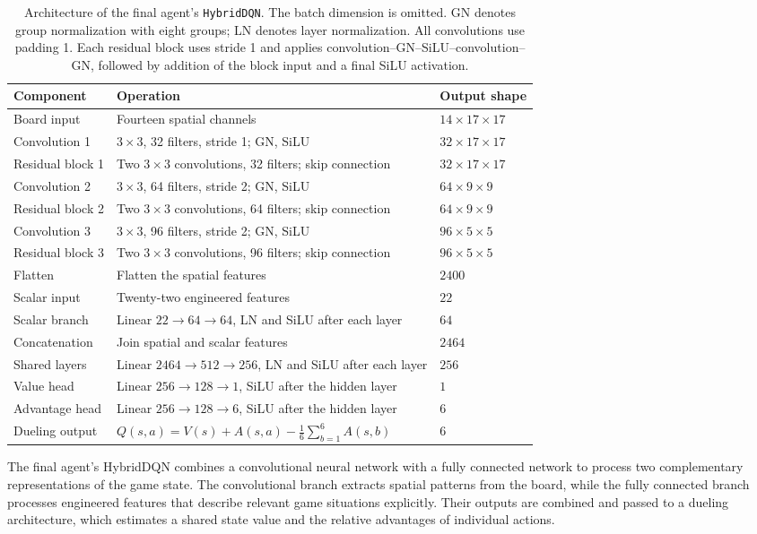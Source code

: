 \documentclass[11pt,a4paper]{article}
\begin{document}
\begin{table}[htbp]
\centering
\small
\begin{tabularx}{\textwidth}{@{}lYl@{}}
\toprule
Component & Operation & Output shape \\
\midrule
Board input & Fourteen spatial channels & $14\times17\times17$ \\
Convolution 1 & $3\times3$, 32 filters, stride 1; GN, SiLU & $32\times17\times17$ \\
Residual block 1 & Two $3\times3$ convolutions, 32 filters; skip connection & $32\times17\times17$ \\
Convolution 2 & $3\times3$, 64 filters, stride 2; GN, SiLU & $64\times9\times9$ \\
Residual block 2 & Two $3\times3$ convolutions, 64 filters; skip connection & $64\times9\times9$ \\
Convolution 3 & $3\times3$, 96 filters, stride 2; GN, SiLU & $96\times5\times5$ \\
Residual block 3 & Two $3\times3$ convolutions, 96 filters; skip connection & $96\times5\times5$ \\
Flatten & Flatten the spatial features & $2400$ \\
\midrule
Scalar input & Twenty-two engineered features & $22$ \\
Scalar branch & Linear $22\to64\to64$, LN and SiLU after each layer & $64$ \\
\midrule
Concatenation & Join spatial and scalar features & $2464$ \\
Shared layers & Linear $2464\to512\to256$, LN and SiLU after each layer & $256$ \\
Value head & Linear $256\to128\to1$, SiLU after the hidden layer & $1$ \\
Advantage head & Linear $256\to128\to6$, SiLU after the hidden layer & $6$ \\
Dueling output & $Q(s,a)=V(s)+A(s,a)-\frac{1}{6}\sum_{b=1}^{6}A(s,b)$ & $6$ \\
\bottomrule
\end{tabularx}
\caption{Architecture of the final agent's \texttt{HybridDQN}.
The batch dimension is omitted.
GN denotes group normalization with eight groups; LN denotes layer normalization.
All convolutions use padding 1.
Each residual block uses stride 1 and applies
convolution--GN--SiLU--convolution--GN, followed by addition of the
block input and a final SiLU activation.}
\label{tab:final-agent-network}
\end{table}
The final agent’s HybridDQN combines a convolutional neural network with a fully connected network to process two complementary representations of the game state. The convolutional branch extracts spatial patterns from the board, while the fully connected branch processes engineered features that describe relevant game situations explicitly. Their outputs are combined and passed to a dueling architecture, which estimates a shared state value and the relative advantages of individual actions.\\
\end{document}
